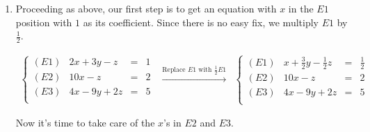 \documentclass{ximera}
\begin{document}
\begin{example}
\begin{enumerate}
\[\begin{array}{ccc}
\begin{array}{lrcr}
\end{array} 

\right.

\end{array}\]


Substituting  $z=6$ into $E2$ gives $y - 3 = -3$ so that $y = 0$.  With $y=0$ and $z=6$, $E1$ becomes $x - 0 + 6 = 5$, or $x = -1$.  Hence, our solution is $(-1,0,6)$.  We leave it to the reader to check that substituting the respective values for $x$, $y$, and $z$ into the original system results in three identities.  

Since there is a solution to the system, the system is classified as consistent. Since there are no free variables,\footnote{Again, see Section \ref{AppLinearSystems} for a review of this concept, if needed.}  the system is classified as  independent.

\item  Proceeding as above, our first step is to get an equation with $x$ in the $E1$ position with $1$ as its coefficient.  Since there is no easy fix, we multiply $E1$ by $\frac{1}{2}$.


\[\begin{array}{ccc}

\left\{ 

\begin{array}{lrcr}

(E1) & 2x+3y-z & = & 1 \\ 
(E2) & 10x-z & = & 2 \\
(E3) &  4x-9y+2z & = & 5 \\

\end{array} 

\right.

&
\xrightarrow{\text{Replace $E1$ with $\frac{1}{2}E1$}}

&

\left\{ 

\begin{array}{lrcr}

(E1) & x+\frac{3}{2}y-\frac{1}{2}z & = & \frac{1}{2} \\ 
(E2) & 10x-z & = & 2 \\
(E3) &  4x-9y+2z & = & 5 \\

\end{array} 

\right.
\end{array}\]

Now it's time to take care of the $x$'s in $E2$ and $E3$.


\end{enumerate}
\end{example}
\end{document}
